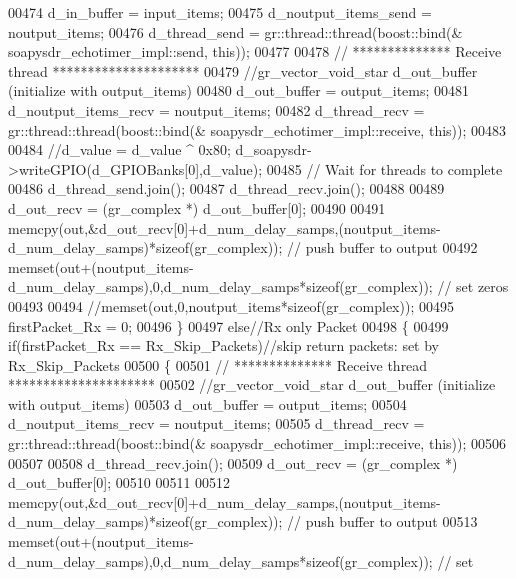 \begin{DoxyCode}
00474         d_in_buffer = input\_items;
00475         d_noutput_items_send = noutput\_items;
00476         d_thread_send = gr::thread::thread(boost::bind(&
      soapysdr_echotimer_impl::send, \textcolor{keyword}{this}));
00477 
00478         \textcolor{comment}{// ************** Receive thread *********************}
00479         \textcolor{comment}{//gr\_vector\_void\_star d\_out\_buffer (initialize with output\_items)}
00480         d_out_buffer = output\_items;
00481         d_noutput_items_recv = noutput\_items;
00482         d_thread_recv = gr::thread::thread(boost::bind(&
      soapysdr_echotimer_impl::receive, \textcolor{keyword}{this}));
00483 
00484         \textcolor{comment}{//d\_value = d\_value ^ 0x80; d\_soapysdr->writeGPIO(d\_GPIOBanks[0],d\_value);}
00485         \textcolor{comment}{// Wait for threads to complete}
00486         d_thread_send.join();
00487         d_thread_recv.join();
00488 
00489         d_out_recv = (gr\_complex *) d_out_buffer[0];
00490 
00491         memcpy(out,&d_out_recv[0]+d_num_delay_samps,(noutput\_items-
      d_num_delay_samps)*\textcolor{keyword}{sizeof}(gr\_complex)); \textcolor{comment}{// push buffer to output}
00492         memset(out+(noutput\_items-d_num_delay_samps),0,d_num_delay_samps*\textcolor{keyword}{sizeof}(gr\_complex)); \textcolor{comment}{// set zeros}
00493 
00494         \textcolor{comment}{//memset(out,0,noutput\_items*sizeof(gr\_complex));}
00495         firstPacket_Rx = 0;
00496       \}
00497       \textcolor{keywordflow}{else}\textcolor{comment}{//Rx only Packet}
00498       \{
00499         \textcolor{keywordflow}{if}(firstPacket_Rx == Rx_Skip_Packets)\textcolor{comment}{//skip return packets: set by Rx\_Skip\_Packets}
00500         \{
00501           \textcolor{comment}{// ************** Receive thread *********************}
00502           \textcolor{comment}{//gr\_vector\_void\_star d\_out\_buffer (initialize with output\_items)}
00503           d_out_buffer = output\_items;
00504           d_noutput_items_recv = noutput\_items;
00505           d_thread_recv = gr::thread::thread(boost::bind(&
      soapysdr_echotimer_impl::receive, \textcolor{keyword}{this}));
00506 
00507 
00508           d_thread_recv.join();
00509           d_out_recv = (gr\_complex *) d_out_buffer[0];
00510 
00511 
00512           memcpy(out,&d_out_recv[0]+d_num_delay_samps,(noutput\_items-
      d_num_delay_samps)*\textcolor{keyword}{sizeof}(gr\_complex)); \textcolor{comment}{// push buffer to output}
00513           memset(out+(noutput\_items-d_num_delay_samps),0,d_num_delay_samps*\textcolor{keyword}{sizeof}(gr\_complex)); \textcolor{comment}{// set
}
\end{DoxyCode}
